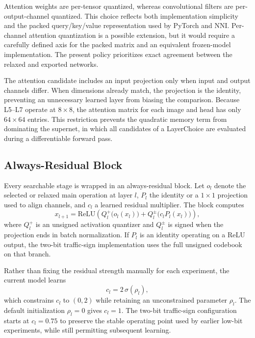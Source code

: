 \documentclass[lettersize,journal]{IEEEtran}
\begin{document}
Attention weights are per-tensor quantized, whereas convolutional filters are per-output-channel quantized. This choice reflects both implementation simplicity and the packed query/key/value representation used by PyTorch and NNI. Per-channel attention quantization is a possible extension, but it would require a carefully defined axis for the packed matrix and an equivalent frozen-model implementation. The present policy prioritizes exact agreement between the relaxed and exported networks.

The attention candidate includes an input projection only when input and output channels differ. When dimensions already match, the projection is the identity, preventing an unnecessary learned layer from biasing the comparison. Because L5--L7 operate at $8\times8$, the attention matrix for each image and head has only $64\times64$ entries. This restriction prevents the quadratic memory term from dominating the supernet, in which all candidates of a LayerChoice are evaluated during a differentiable forward pass.

\subsection{Always-Residual Block}
Every searchable stage is wrapped in an always-residual block. Let $o_l$ denote the selected or relaxed main operation at layer $l$, $P_l$ the identity or a $1\times1$ projection used to align channels, and $c_l$ a learned residual multiplier. The block computes
\begin{equation}
x_{l+1}=\mathrm{ReLU}\left(
Q^{+}_{l}\big(o_l(x_l)\big)+
Q^{\pm}_{l}\big(c_lP_l(x_l)\big)
\right),
\label{eq:residual}
\end{equation}
where $Q^{+}_{l}$ is an unsigned activation quantizer and $Q^{\pm}_{l}$ is signed when the projection ends in batch normalization. If $P_l$ is an identity operating on a ReLU output, the two-bit traffic-sign implementation uses the full unsigned codebook on that branch.

Rather than fixing the residual strength manually for each experiment, the current model learns
\begin{equation}
c_l=2\,\sigma(\rho_l),
\label{eq:residualscale}
\end{equation}
which constrains $c_l$ to $(0,2)$ while retaining an unconstrained parameter $\rho_l$. The default initialization $\rho_l=0$ gives $c_l=1$. The two-bit traffic-sign configuration starts at $c_l=0.75$ to preserve the stable operating point used by earlier low-bit experiments, while still permitting subsequent learning.
\end{document}

